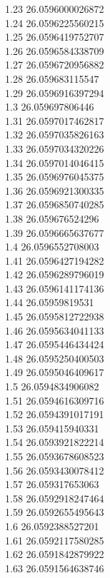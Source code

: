 {1.23	26.0596000026872\\
1.24	26.0596225560215\\
1.25	26.0596419752707\\
1.26	26.0596584338709\\
1.27	26.0596720956882\\
1.28	26.059683115547\\
1.29	26.0596916397294\\
1.3	26.059697806446\\
1.31	26.0597017462817\\
1.32	26.0597035826163\\
1.33	26.0597034320226\\
1.34	26.0597014046415\\
1.35	26.0596976045375\\
1.36	26.0596921300335\\
1.37	26.0596850740285\\
1.38	26.059676524296\\
1.39	26.0596665637677\\
1.4	26.0596552708003\\
1.41	26.0596427194282\\
1.42	26.0596289796019\\
1.43	26.0596141174136\\
1.44	26.05959819531\\
1.45	26.0595812722938\\
1.46	26.0595634041133\\
1.47	26.0595446434424\\
1.48	26.0595250400503\\
1.49	26.0595046409617\\
1.5	26.0594834906082\\
1.51	26.0594616309716\\
1.52	26.0594391017191\\
1.53	26.059415940331\\
1.54	26.0593921822214\\
1.55	26.0593678608523\\
1.56	26.0593430078412\\
1.57	26.059317653063\\
1.58	26.0592918247464\\
1.59	26.0592655495643\\
1.6	26.0592388527201\\
1.61	26.0592117580285\\
1.62	26.0591842879922\\
1.63	26.0591564638746\\
}
